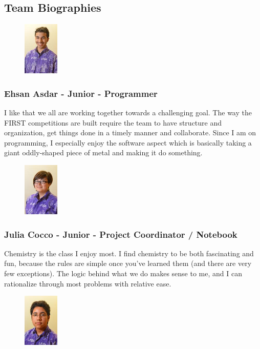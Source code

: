 \clearpage
\newpage

\subsection{Team Biographies}
\begin{figure}
	\color{darkgray}
	\centering
	\includegraphics[height=1in]{ehsan}
\end{figure}
\subsubsection{Ehsan Asdar - Junior - Programmer} 
I like that we all are working together towards a challenging goal. The way the FIRST competitions are built require the team to have structure and organization, get things done in a timely manner and collaborate. Since I am on programming, I especially enjoy the software aspect which is basically taking a giant oddly-shaped piece of metal and making it do something.

\begin{figure}
	\color{darkgray}
	\centering
	\includegraphics[height=1in]{julia}
\end{figure}
\subsubsection{Julia Cocco - Junior - Project Coordinator / Notebook}
Chemistry is the class I enjoy most. I find chemistry to be both fascinating and fun, because the rules are simple once you've learned them (and there are very few exceptions). The logic behind what we do makes sense to me, and I can rationalize through most problems with relative ease.

\begin{figure}
	\color{darkgray}
	\centering
	\includegraphics[height=1in]{izzy}
\end{figure}
